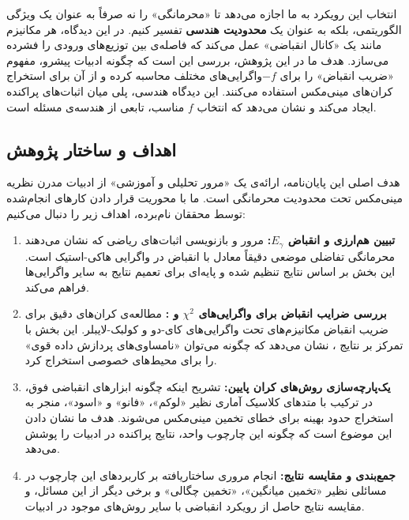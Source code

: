 انتخاب این رویکرد به ما اجازه می‌دهد تا «محرمانگی» را نه صرفاً به عنوان یک ویژگی الگوریتمی، بلکه به عنوان یک \textbf{محدودیت هندسی} تفسیر کنیم. در این دیدگاه، هر مکانیزم  مانند یک «کانال انقباضی» عمل می‌کند که فاصله‌ی بین توزیع‌های ورودی را فشرده می‌سازد. هدف ما در این پژوهش، بررسی این است که چگونه ادبیات پیشرو، مفهوم «ضریب انقباض» را برای $-f$واگرایی‌های مختلف محاسبه کرده و از آن برای استخراج کران‌های مینی‌مکس استفاده می‌کنند. این دیدگاه هندسی، پلی میان اثبات‌های پراکنده ایجاد می‌کند و نشان می‌دهد که انتخاب $f$ مناسب، تابعی از هندسه‌ی مسئله است.

\subsection{اهداف و ساختار پژوهش}
\label{sec:intro:objectives}

هدف اصلی این پایان‌نامه، ارائه‌ی یک «مرور تحلیلی و آموزشی» از ادبیات مدرن نظریه مینی‌مکس تحت محدودیت محرمانگی است. ما با محوریت قرار دادن کارهای انجام‌شده توسط محققان نام‌برده، اهداف زیر را دنبال می‌کنیم:

\begin{enumerate}
    \item \textbf{تبیین هم‌ارزی  و انقباض $E_\gamma$:}
    مرور و بازنویسی اثبات‌های ریاضی که نشان می‌دهند محرمانگی تفاضلی موضعی دقیقاً معادل با انقباض در واگرایی هاکی-استیک است. این بخش بر اساس نتایج \cite{Asoodeh2021} تنظیم شده و پایه‌ای برای تعمیم نتایج به سایر واگرایی‌ها فراهم می‌کند.

    \item \textbf{بررسی ضرایب انقباض برای واگرایی‌های $\chi^2$ و :}
    مطالعه‌ی کران‌های دقیق برای ضریب انقباض مکانیزم‌های  تحت واگرایی‌های کای-دو و کولبک-لایبلر. این بخش با تمرکز بر نتایج \cite{Asoodeh2024}، نشان می‌دهد که چگونه می‌توان «نامساوی‌های پردازش داده قوی» را برای محیط‌های خصوصی استخراج کرد.

    \item \textbf{یک‌پارچه‌سازی روش‌های کران پایین:}
    تشریح اینکه چگونه ابزارهای انقباضی فوق، در ترکیب با متدهای کلاسیک آماری نظیر «لوکم»، «فانو» و «اسود»، منجر به استخراج حدود بهینه برای خطای تخمین مینی‌مکس می‌شوند. هدف ما نشان دادن این موضوع است که چگونه این چارچوب واحد، نتایج پراکنده در ادبیات را پوشش می‌دهد.
    
    \item \textbf{جمع‌بندی و مقایسه نتایج:}
    انجام مروری ساختاریافته بر کاربردهای این چارچوب در مسائلی نظیر «تخمین میانگین»، «تخمین چگالی» و برخی دیگر از این مسائل، و مقایسه نتایج حاصل از رویکرد انقباضی با سایر روش‌های موجود در ادبیات.
\end{enumerate}